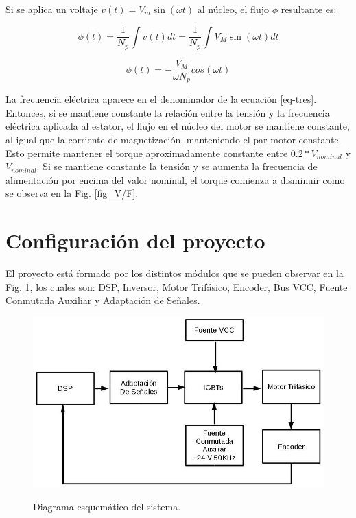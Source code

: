 \documentclass[conference]{IEEEtran}
\begin{document}
Si se aplica un voltaje 
$v\left(t\right) = V_{m}\sin(\omega t)$ 
al núcleo, el flujo $\phi$ resultante es:

\begin{equation}
\phi (t)=\frac { 1 }{ { N }_{ p } } \int { v(t)dt }= \frac { 1 }{ { N }_{ p } } \int { { V }_{ M }\sin { (\omega t)} dt } 
\end{equation}

\begin{equation}
\phi(t)=-\frac { { V }_{ M } }{ \omega{ N }_{ p } } cos(\omega t)\label{eq-tres}
\end{equation}

La frecuencia eléctrica aparece en el denominador de la ecuación \ref{eq-tres}. Entonces, si se mantiene constante la relación entre la tensión y la frecuencia eléctrica aplicada al estator, el flujo en el núcleo del motor se mantiene constante, al igual que la corriente de magnetización, manteniendo el par motor constante. Esto permite mantener el torque aproximadamente constante entre $0.2*{V}_{nominal}$ y ${V}_{nominal}$. Si se mantiene constante la tensión y se aumenta la frecuencia de alimentación por encima del valor nominal, el torque comienza a disminuir como se observa en la Fig. \ref{fig_V/F}.


\section{Configuración del proyecto}

El proyecto está formado por los distintos módulos que se pueden observar en la Fig. \ref{fig_esq}, los cuales son: DSP, Inversor, Motor Trifásico, Encoder, Bus VCC, Fuente Conmutada Auxiliar y Adaptación de Señales.

\begin{figure}[!t]
\centering
\includegraphics[width=8 cm]{figuras/figura_09.jpeg} \\
\caption{Diagrama esquemático del sistema.} 
\label{fig_esq}
\end{figure}
\end{document}
